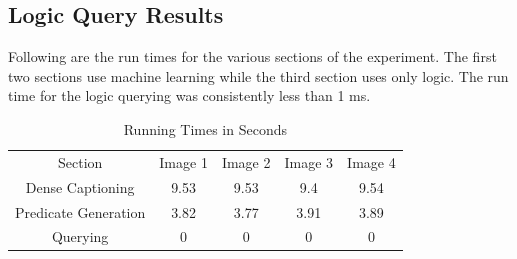 \subsection{Logic Query Results}
Following are the run times for the various sections of the experiment. The first two sections use machine learning while the third section uses only logic. The run time for the logic querying was consistently less than 1 ms.
\begin{table}[htbp]
\caption{Running Times in Seconds}
\begin{center}
\begin{tabular}{|c|c|c|c|c|}
\hline
Section& Image 1& Image 2& Image 3& Image 4 \\
Dense Captioning& 9.53& 9.53& 9.4& 9.54 \\
Predicate Generation& 3.82& 3.77& 3.91& 3.89 \\
Querying& 0& 0& 0& 0 \\
\hline
\end{tabular}
\end{center}
\end{table}
